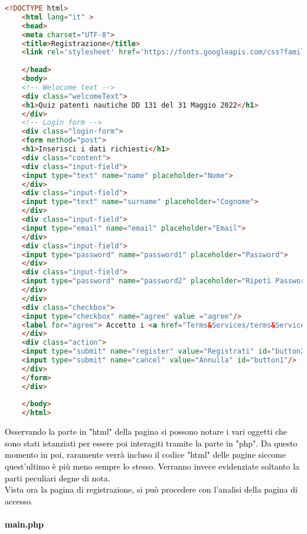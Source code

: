  \begin{lstlisting}[language=html]
 	<!DOCTYPE html>
 	<html lang="it" >
 	<head>
 	<meta charset="UTF-8">
 	<title>Registrazione</title>
 	<link rel='stylesheet' href='https://fonts.googleapis.com/css?family=Rubik:400,700'><link rel="stylesheet" href="style.css">
 	
 	</head>
 	<body>
 	<!-- Welocome text -->
 	<div class="welcomeText">
 	<h1>Quiz patenti nautiche DD 131 del 31 Maggio 2022</h1>
 	</div>
 	<!-- Login form -->
 	<div class="login-form">
 	<form method="post">
 	<h1>Inserisci i dati richiesti</h1>
 	<div class="content">
 	<div class="input-field">
 	<input type="text" name="name" placeholder="Nome">
 	</div>
 	<div class="input-field">
 	<input type="text" name="surname" placeholder="Cognome">
 	</div>
 	<div class="input-field">
 	<input type="email" name="email" placeholder="Email">
 	</div>
 	<div class="input-field">
 	<input type="password" name="password1" placeholder="Password">
 	</div>
 	<div class="input-field">
 	<input type="password" name="password2" placeholder="Ripeti Password">
 	</div>
 	</div>
 	<div class="checkbox">
 	<input type="checkbox" name="agree" value ="agree"/>
 	<label for="agree"> Accetto i <a href="Terms&Services/terms&Services.html">Termini</a> di utilizzo</label>
 	</div>
 	<div class="action">
 	<input type="submit" name="register" value="Registrati" id="button2"/>
 	<input type="submit" name="cancel" value="Annulla" id="button1"/>
 	</div>
 	</form>
 	</div>
 	
 	</body>
 	</html>
  \end{lstlisting}
  
  \textcolor{black}{Osservando la parte in "html" della pagina si possono notare i vari oggetti che sono stati istanziati per essere poi interagiti tramite la parte in "php". Da questo momento in poi, raramente verrà incluso il codice "html" delle pagine siccome quest'ultimo è più meno sempre lo stesso. Verranno invece evidenziate soltanto la parti peculiari degne di nota.}\\
  
  \textcolor{black}{Vista ora la pagina di registrazione, si può procedere con l'analisi della pagina di accesso.}\\
  
  \paragraph{\textcolor{black}{main.php}}\leavevmode\\
  
